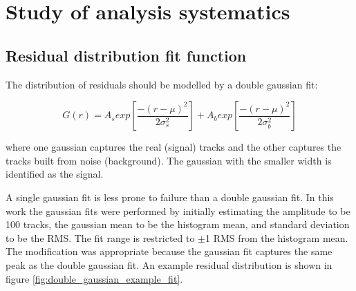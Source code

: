 \chapter[Analysis systematics]{Study of analysis systematics}
\label{appendix:systematics}

\section{Residual distribution fit function}
\label{appendix:systematics_res_fit_fcn}

The distribution of residuals should be modelled by a double gaussian fit:

\begin{equation}
\label{eqn:doub_gaus}
G(r) = A_{s}exp\left[ \frac{-(r-\mu)^{2}}{2\sigma_s^{2}} \right] + A_{b}exp\left[ \frac{-(r-\mu)^{2}}{2\sigma_b^{2}} \right]
\end{equation}

where one gaussian captures the real (signal) tracks and the other captures the tracks built from noise (background). The gaussian with the smaller width is identified as the signal. 

A single gaussian fit is less prone to failure than a double gaussian fit. In this work the gaussian fits were performed by initially estimating the amplitude to be 100 tracks, the gaussian mean to be the histogram mean, and standard deviation to be the RMS. The fit range is restricted to $\pm$1 RMS from the histogram mean. The modification was appropriate because the gaussian fit captures the same peak as the double gaussian fit. An example residual distribution is shown in figure \ref{fig:double_gaussian_example_fit}. 

